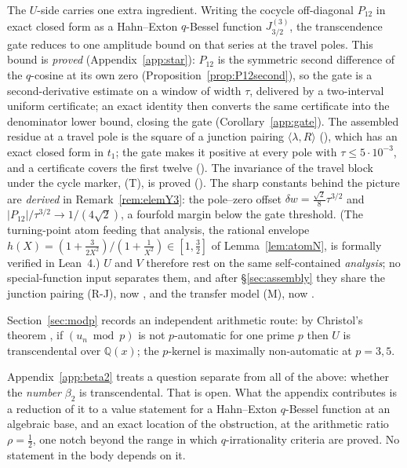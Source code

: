 \documentclass[11pt]{article}
\theoremstyle{plain}
\theoremstyle{definition}
\theoremstyle{remark}
\newcommand{\Q}{\mathbb{Q}}
\begin{document}
The $U$-side carries one extra ingredient. Writing the cocycle off-diagonal $P_{12}$ in exact
closed form as a Hahn--Exton $q$-Bessel function $J^{(3)}_{3/2}$, the transcendence gate reduces to
one amplitude bound on that series at the travel poles. This bound is \emph{proved}
(Appendix~\ref{app:star}): $P_{12}$ is the symmetric second difference of the $q$-cosine at its own
zero (Proposition~\ref{prop:P12second}), so the gate is a second-derivative estimate on a window of
width $\tau$, delivered by a two-interval uniform certificate; an exact identity then converts the
same certificate into the denominator lower bound, closing the gate
(Corollary~\ref{app:gate}). The assembled residue at a travel pole is the square of a junction
pairing $\langle\lambda,R\rangle$ ({\cite[Proposition ``the shape of the local form'', \textup{prop:shape}]{Bonfioli2026bA}}), which has an exact closed form in
$t_1$; the gate makes it positive at every pole with $\tau\le5\cdot10^{-3}$, and a certificate covers
the first twelve ({\cite[Theorem ``closed form of the junction pairing'', \textup{thm:RJ}]{Bonfioli2026bA}}). The invariance of the travel block under the cycle marker,
\textup{(T)}, is proved ({\cite[Proposition ``Invariance of the travel block'', \textup{prop:travelinv}]{Bonfioli2026bA}}). The sharp constants behind the picture are \emph{derived} in
Remark~\ref{rem:elemY3}: the pole--zero offset $\delta w=\tfrac{\sqrt2}8\tau^{3/2}$ and
$|P_{12}|/\tau^{3/2}\to1/(4\sqrt2)$, a fourfold margin below the gate threshold. (The
turning-point atom feeding that analysis, the rational envelope
$h(X)=(1+\tfrac3{2X^2})/(1+\tfrac1{X^2})\in[1,\tfrac32]$ of Lemma~\ref{lem:atomN}, is formally
verified in Lean~4.) $U$ and $V$ therefore rest on the same self-contained \emph{analysis}; no
special-function input separates them, and after \S\ref{sec:assembly} they share the junction
pairing \textup{(R-J)}, now {\cite[Theorem ``closed form of the junction pairing'', \textup{thm:RJ}]{Bonfioli2026bA}}, and the transfer model \textup{(M)}, now
{\cite[Theorem ``the transfer model \textup{(M)}'', \textup{thm:model}]{Bonfioli2026bA}}.

Section~\ref{sec:modp} records an independent arithmetic route: by Christol's theorem
\cite{Christol1979,CKMR1980}, if
$(u_n\bmod p)$ is not $p$-automatic for one prime $p$ then $U$ is transcendental over $\Q(x)$; the
$p$-kernel is maximally non-automatic at $p=3,5$.

Appendix~\ref{app:beta2} treats a question separate from all of the above: whether the \emph{number}
$\beta_2$ is transcendental. That is open. What the appendix contributes is a reduction of it to a
value statement for a Hahn--Exton $q$-Bessel function at an algebraic base, and an exact location of
the obstruction, at the arithmetic ratio $\rho=\tfrac12$, one notch beyond the range in which
$q$-irrationality criteria are proved. No statement in the body depends on it.
\end{document}
